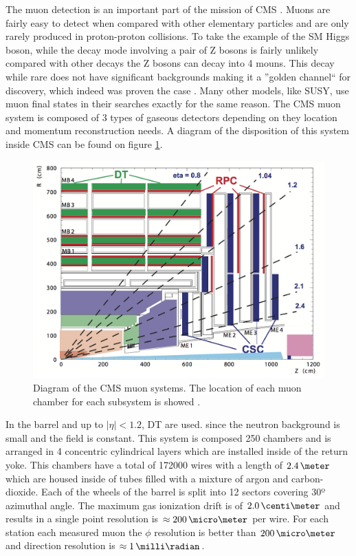 The muon detection is an important part of the mission of \gls{CMS} \cite{CMSTDR:CMSMuonSystem}. Muons are fairly easy to detect when compared with other elementary particles and are only rarely produced in proton-proton collisions. To take the example of the \gls{SM} Higgs boson, while the decay mode involving a pair of Z bosons is fairly unlikely compared with other decays the Z bosons can decay into 4 mouns. This decay while rare does not have significant backgrounds making it a ''golden channel`` for discovery, which indeed was proven the case \cite{ARTICLE:CMSHiggsObservation}. Many other models, like SUSY, use muon final states in their searches exactly for the same reason. The \gls{CMS} muon system is composed of 3 types of gaseous detectors depending on they location and momentum reconstruction needs. A diagram of the disposition of this system inside \gls{CMS} can be found on figure \ref{FIGURE:ExperimentalApparatus_CMS_Muon_Layout}.

\begin{figure}[!htb]
  \centering
  \includegraphics{Chapter02/CMS/Images/CMS_Muon_Layout.png}
  \caption{Diagram of the \gls{CMS} muon systems. The location of each muon chamber for each subsystem is showed \cite{CMSTDR:CMSPhysicsVol1}.}
  \label{FIGURE:ExperimentalApparatus_CMS_Muon_Layout}
\end{figure}

In the barrel and up to $|\eta|<1.2$, \gls{DT} are used. since the neutron background is small and the field is constant. This system is composed 250 chambers and is arranged in 4 concentric cylindrical layers which are installed inside of the return yoke. This chambers have a total of 172000 wires with a length of $2.4\,\meter$ which are housed inside of tubes filled with a mixture of argon and carbon-dioxide. Each of the wheels of the barrel is split into 12 sectors covering 30º azimuthal angle. The maximum gas ionization drift is of $2.0\,\centi\meter$ and results in a single point resolution is $\approx 200\,\micro\meter$ per wire. For each station each measured muon the $\phi$ resolution is better than $200\,\micro\meter$ and direction resolution is $\approx 1\,\milli\radian$.

